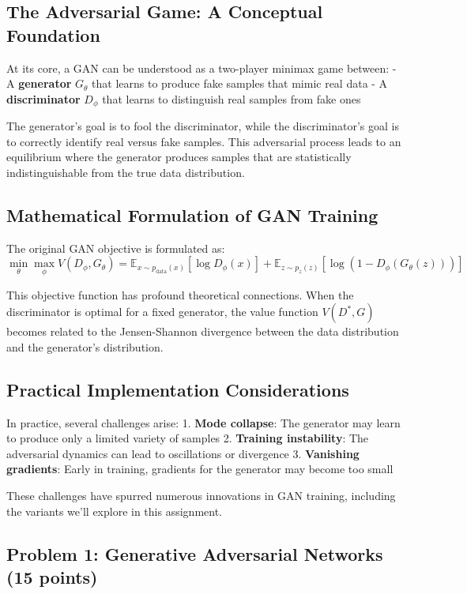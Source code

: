 \documentclass{article}
\begin{document}
\subsection{The Adversarial Game: A Conceptual Foundation}

At its core, a GAN can be understood as a two-player minimax game between:
- A \textbf{generator} $G_\theta$ that learns to produce fake samples that mimic real data
- A \textbf{discriminator} $D_\phi$ that learns to distinguish real samples from fake ones

The generator's goal is to fool the discriminator, while the discriminator's goal is to correctly identify real versus fake samples. This adversarial process leads to an equilibrium where the generator produces samples that are statistically indistinguishable from the true data distribution.

\subsection{Mathematical Formulation of GAN Training}

The original GAN objective is formulated as:
\[
\min_\theta \max_\phi V(D_\phi, G_\theta) = \mathbb{E}_{x \sim p_{\text{data}}(x)} [\log D_\phi(x)] + \mathbb{E}_{z \sim p_z(z)} [\log(1 - D_\phi(G_\theta(z)))]
\]

This objective function has profound theoretical connections. When the discriminator is optimal for a fixed generator, the value function $V(D^*, G)$ becomes related to the Jensen-Shannon divergence between the data distribution and the generator's distribution.

\subsection{Practical Implementation Considerations}

In practice, several challenges arise:
1. \textbf{Mode collapse}: The generator may learn to produce only a limited variety of samples
2. \textbf{Training instability}: The adversarial dynamics can lead to oscillations or divergence
3. \textbf{Vanishing gradients}: Early in training, gradients for the generator may become too small

These challenges have spurred numerous innovations in GAN training, including the variants we'll explore in this assignment.

\subsection{Problem 1: Generative Adversarial Networks (15 points)}
\end{document}
